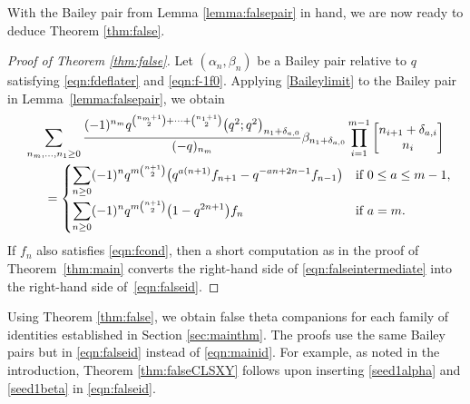 \documentclass[pdftex]{sigma}
\numberwithin{equation}{section}
\begin{document}
With the Bailey pair from Lemma \ref{lemma:falsepair} in hand, we are now ready to deduce Theorem \ref{thm:false}.

\begin{proof}[Proof of Theorem \ref{thm:false}]
Let $(\alpha_n,\beta_n)$ be a Bailey pair relative to $q$ satisfying \eqref{eqn:fdeflater} and \eqref{eqn:f-1f0}.
Applying \eqref{Baileylimit} to the Bailey pair in Lemma~\ref{lemma:falsepair}, we obtain
\begin{gather}
		\sum_{n_m, \dots, n_1 \geq 0} \frac{(-1)^{n_m}q^{\binom{n_m+1}{2} + \cdots + \binom{n_1+1}{2}}\bigl(q^2;q^2\bigr)_{n_1+\delta_{a,0}}}{(-q)_{n_m}} \beta_{n_1+\delta_{a,0}} \prod_{i=1}^{m-1} \begin{bmatrix} n_{i+1} + \delta_{a,i} \\ n_i \end{bmatrix}
		\nonumber\\
		\qquad{}=
		\begin{cases}
			\displaystyle\sum_{n\geq 0}
			(-1)^nq^{m\binom{n+1}{2}}\bigl(
			q^{a(n+1)}f_{n+1} -q^{-an+2n-1}f_{n-1}\bigr)
			& \text{if $0\leq a \leq m-1$},\vspace{1mm}\\
			\displaystyle\sum_{n\geq 0}
			(-1)^nq^{m\binom{n+1}{2}}\bigl(
			1-q^{2n+1}\bigr)f_n
			& \text{if $a=m$}.
		\end{cases}\label{eqn:falseintermediate}
\end{gather}
If $f_n$ also satisfies \eqref{eqn:fcond}, then a short computation as in the proof of Theorem~\ref{thm:main} converts the right-hand side of \eqref{eqn:falseintermediate} into the right-hand side of~\eqref{eqn:falseid}.
\end{proof}

Using Theorem \ref{thm:false}, we obtain false theta companions for each family of identities established in Section \ref{sec:mainthm}. The proofs use the same Bailey pairs but in \eqref{eqn:falseid} instead of \eqref{eqn:mainid}. For example, as noted in the introduction, Theorem \ref{thm:falseCLSXY} follows upon inserting \eqref{seed1alpha} and \eqref{seed1beta} in \eqref{eqn:falseid}.
\end{document}

